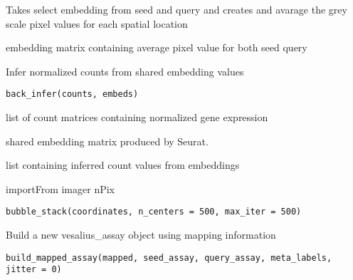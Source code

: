 \documentclass[a4paper]{book}
\begin{document}
%
\begin{Details}
Takes select embedding from seed and query and 
creates and avarage the grey scale pixel values for each spatial
location
\end{Details}
%
\begin{Value}
embedding matrix containing average pixel value for both seed
query
\end{Value}
%
\begin{Description}
Infer normalized counts from shared embedding values
\end{Description}
%
\begin{Usage}
\begin{verbatim}
back_infer(counts, embeds)
\end{verbatim}
\end{Usage}
%
\begin{Arguments}
\begin{ldescription}
\item[\code{counts}] list of count matrices containing normalized gene expression

\item[\code{embeds}] shared embedding matrix produced by Seurat.
\end{ldescription}
\end{Arguments}
%
\begin{Value}
list containing inferred count values from embeddings
\end{Value}
%
\begin{Description}
importFrom imager nPix
\end{Description}
%
\begin{Usage}
\begin{verbatim}
bubble_stack(coordinates, n_centers = 500, max_iter = 500)
\end{verbatim}
\end{Usage}
%
\begin{Description}
Build a new vesalius\_assay object using mapping information
\end{Description}
%
\begin{Usage}
\begin{verbatim}
build_mapped_assay(mapped, seed_assay, query_assay, meta_labels, jitter = 0)
\end{verbatim}
\end{Usage}
\end{document}
